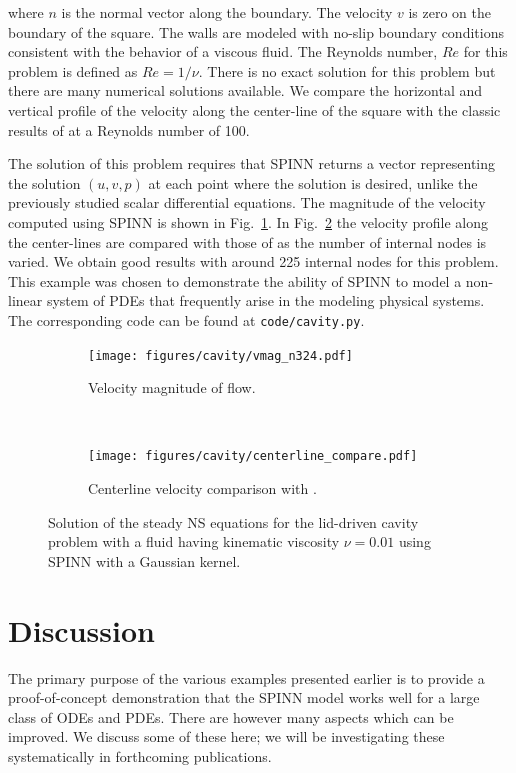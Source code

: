 \documentclass[12pt]{article}
\begin{document}
where $n$ is the normal vector along the boundary. The velocity $v$ is zero on the boundary of the square. The walls are modeled with no-slip boundary conditions consistent with the behavior of a viscous fluid. The Reynolds number, $Re$ for this problem is defined as $Re = 1/\nu$. There is no exact solution for this problem but there are many numerical solutions available.  We compare the horizontal and vertical profile of the velocity along the center-line of the square with the classic results of \cite{ldc:ghia} at a Reynolds number of 100.

The solution of this problem requires that SPINN returns a vector representing the solution $(u, v, p)$ at each point where the solution is desired, unlike the previously studied scalar differential equations. The magnitude of the velocity computed using SPINN is shown in Fig.~\ref{fig:ldc_velocity}.  In Fig.~\ref{fig:ldc_ghia_compare} the velocity profile along the center-lines are compared with those of \cite{ldc:ghia} as the number of internal nodes is varied.  We obtain good results with around 225 internal nodes for this problem.  This example was chosen to demonstrate the ability of SPINN to model a non-linear system of PDEs that frequently arise in the modeling physical systems. The corresponding code can be found at \verb|code/cavity.py|.

\begin{figure}
\begin{subfigure}{0.51\textwidth}
\texttt{[image: figures/cavity/vmag\_n324.pdf]}
\caption{Velocity magnitude of flow.}
\label{fig:ldc_velocity}
\end{subfigure}
~
\begin{subfigure}{0.49\textwidth}
\texttt{[image: figures/cavity/centerline\_compare.pdf]}
\caption{Centerline velocity comparison with \cite{ldc:ghia}.}
\label{fig:ldc_ghia_compare}
\end{subfigure}
\caption{Solution of the steady NS equations for the lid-driven cavity problem with a fluid having kinematic viscosity $\nu=0.01$ using SPINN with a Gaussian kernel.}
\label{fig:ldc}
\end{figure}

\section{Discussion}

The primary purpose of the various examples presented earlier is to provide a proof-of-concept demonstration that the SPINN model works well for a large class of ODEs and PDEs. There are however many aspects which can be improved. We discuss some of these here; we will be investigating these systematically in forthcoming publications.
\end{document}

